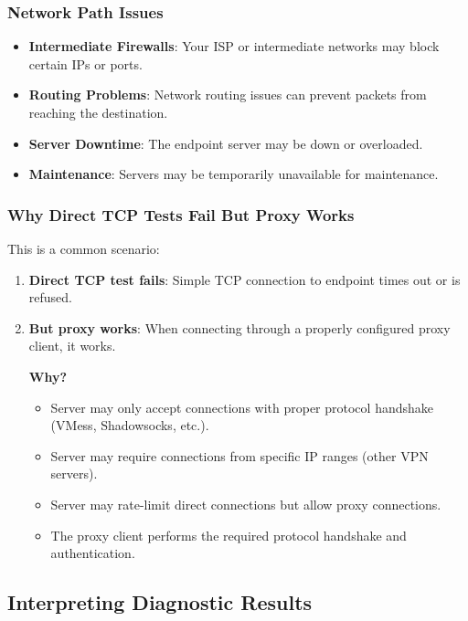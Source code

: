 \subsubsection{Network Path Issues}

\begin{itemize}
    \item \textbf{Intermediate Firewalls}: Your ISP or intermediate networks may block certain IPs or ports.
    \item \textbf{Routing Problems}: Network routing issues can prevent packets from reaching the destination.
    \item \textbf{Server Downtime}: The endpoint server may be down or overloaded.
    \item \textbf{Maintenance}: Servers may be temporarily unavailable for maintenance.
\end{itemize}

\subsubsection{Why Direct TCP Tests Fail But Proxy Works}

This is a common scenario:

\begin{enumerate}
    \item \textbf{Direct TCP test fails}: Simple TCP connection to endpoint times out or is refused.
    \item \textbf{But proxy works}: When connecting through a properly configured proxy client, it works.
    
    \textbf{Why?}
    \begin{itemize}
        \item Server may only accept connections with proper protocol handshake (VMess, Shadowsocks, etc.).
        \item Server may require connections from specific IP ranges (other VPN servers).
        \item Server may rate-limit direct connections but allow proxy connections.
        \item The proxy client performs the required protocol handshake and authentication.
    \end{itemize}
\end{enumerate}

\subsection{Interpreting Diagnostic Results}

